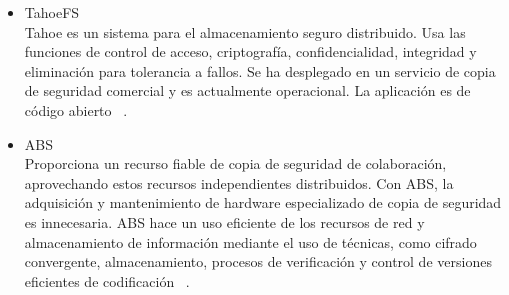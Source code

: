 \begin{itemize}
\item TahoeFS\\
Tahoe es un sistema para el almacenamiento seguro distribuido. Usa las funciones de control de acceso, criptografía, confidencialidad, integridad y eliminación para tolerancia a fallos. Se ha desplegado en un servicio de copia de seguridad comercial y es actualmente operacional. La aplicación es de código abierto ~\cite{tahoe}.
\item ABS\\
Proporciona un recurso fiable de copia de seguridad de colaboración, aprovechando estos recursos independientes distribuidos. Con ABS, la adquisición y mantenimiento de hardware especializado de copia de seguridad es innecesaria. ABS hace un uso eficiente de los recursos de red y almacenamiento de información mediante el uso de técnicas, como cifrado convergente, almacenamiento, procesos de verificación y control de versiones eficientes de codificación ~\cite{abs}.
\end{itemize}



